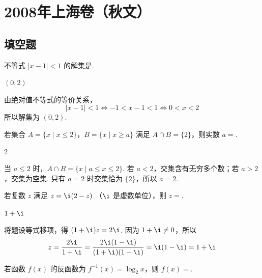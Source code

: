 \chapter{2008年上海卷（秋文）}

\section{填空题}

\begin{problem}
不等式 \(|x - 1| < 1\) 的解集是\fillinblank{}.
\end{problem}

\begin{answer}
\(\left(0,2\right)\)
\end{answer}

\begin{solution}
由绝对值不等式的等价关系，
\[
|x-1|<1\Longleftrightarrow -1<x-1<1\Longleftrightarrow 0<x<2
\]
所以解集为 \(\left(0,2\right)\).
\end{solution}

\begin{problem}
若集合 \(A = \{x \mid x \leqslant 2\}\)，\(B = \{x \mid x \geqslant a\}\) 满足 \(A \cap B = \{2\}\)，则实数 \(a = \)\fillinblank{}.
\end{problem}

\begin{answer}
\(2\)
\end{answer}

\begin{solution}
当 \(a\leqslant2\) 时，\(A\cap B=\{x\mid a\leqslant x\leqslant2\}\). 若 \(a<2\)，交集含有无穷多个数；若 \(a>2\)，交集为空集. 只有 \(a=2\) 时交集恰为 \(\{2\}\)，所以 \(a=2\).
\end{solution}

\begin{problem}
若复数 \(z\) 满足 \(z = \i(2 - z)\) （\(\i\) 是虚数单位），则 \(z = \)\fillinblank{}.
\end{problem}

\begin{answer}
\(1+\i\)
\end{answer}

\begin{solution}
将题设等式移项，得 \((1+\i)z=2\i\). 因为 \(1+\i\neq0\)，所以
\[
z=\frac{2\i}{1+\i}=\frac{2\i(1-\i)}{(1+\i)(1-\i)}=\i(1-\i)=1+\i
\]
\end{solution}

\begin{problem}
若函数 \(f(x)\) 的反函数为 \(f^{-1}(x)=\log_{2}x\)，则 \(f(x)=\)\fillinblank{}.
\end{problem}

